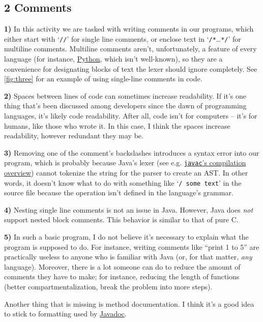 \documentclass[leqno, 11pt]{article}
\begin{document}
\subsection*{2 Comments}
\textbf{1)} In this activity we are tasked with writing comments in our programs, which either start with `\texttt{//}' for single line comments, or enclose text in `\texttt{/*}\ldots\texttt{*/}' for multiline comments. Multiline comments aren't, unfortunately, a feature of every language (for instance, \href{https://twitter.com/gvanrossum/status/112670605505077248}{Python}, which isn't well-known), so they are a convenience for designating blocks of text the lexer should ignore completely. See \autoref{fig:three} for an example of using single-line comments in code.

\textbf{2)} Spaces between lines of code can sometimes increase readability. If it's one thing that's been discussed among developers since the dawn of programming languages, it's likely code readability. After all, code isn't for computers -- it's for humans, like those who wrote it. In this case, I think the spaces increase readability, however redundant they may be.

\textbf{3)} Removing one of the comment's backslashes introduces a syntax error into our program, which is probably because Java's lexer (see e.g. \href{http://openjdk.java.net/groups/compiler/doc/compilation-overview/index.html}{\texttt{javac}'s compilation overview}) cannot tokenize the string for the parser to create an AST. In other words, it doesn't know what to do with something like `\texttt{/ some text}' in the source file because the operation isn't defined in the language's grammar.

\textbf{4)} Nesting single line comments is not an issue in Java. However, Java does \textit{not} support nested block comments. This behavior is similar to that of pure C.

\textbf{5) }In such a basic program, I do not believe it's necessary to explain what the program is supposed to do. For instance, writing comments like ``print 1 to 5'' are practically useless to anyone who is familiar with Java (or, for that matter, \textit{any} language). Moreover, there is a lot someone can do to reduce the amount of comments they have to make; for instance, reducing the length of functions (better compartmentalization, break the problem into more steps).

Another thing that is missing is method documentation. I think it's a good idea to stick to formatting used by \href{http://www.oracle.com/technetwork/java/javase/tech/index-137868.html}{Javadoc}.
\end{document}
